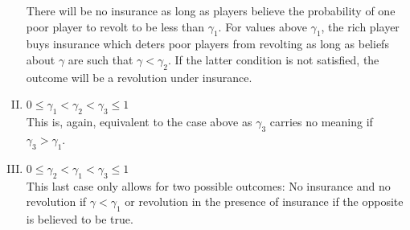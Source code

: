 \documentclass[12pt]{article}
\begin{document}
\begin{enumerate}[I.]
				There will be no insurance as long as players believe the 
				probability of one poor player to revolt to be less than 
				$\gamma_1$. For values above $\gamma_1$, the rich player buys 
				insurance which deters poor players from revolting as long as 
				beliefs about $\gamma$ are such that $\gamma<\gamma_2$. If the 
				latter condition is not satisfied, the outcome will be a 
				revolution under insurance.
		\item	$0 \leq \gamma_1 < \gamma_2 < \gamma_3 \leq 1$\\
				This is, again, equivalent to the case above as $\gamma_3$ 
				carries no meaning if $\gamma_3 > \gamma_1$.
		\item	$0 \leq \gamma_2 < \gamma_1 < \gamma_3 \leq 1$\\
				This last case only allows for two possible outcomes: No 
				insurance and no revolution if $\gamma<\gamma_1$ or revolution 
				in the presence of insurance if the opposite is believed to be 
				true.
	\end{enumerate}
	
\end{document}
